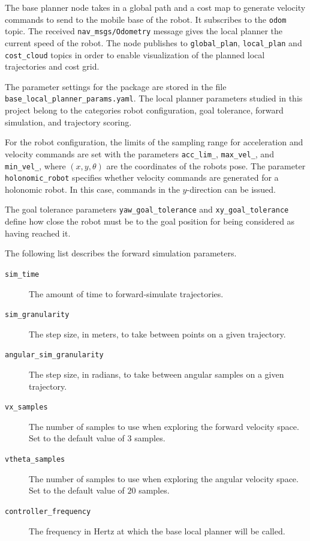 \documentclass[10pt,journal,compsoc]{IEEEtran}
\begin{document}
The base planner node takes in a global path and a cost map to generate velocity commands to send to the mobile base of the robot. It subscribes to the \texttt{odom} topic. The received \texttt{nav\_msgs/Odometry} message gives the local planner the current speed of the robot. The node publishes to \texttt{global\_plan}, \texttt{local\_plan} and \texttt{cost\_cloud} topics in order to enable visualization of the planned local trajectories and cost grid.

The parameter settings for the package are stored in the file \texttt{base\_local\_planner\_params.yaml}. The local planner parameters studied in this project belong to the categories robot configuration, goal tolerance, forward simulation, and trajectory scoring.

For the robot configuration, the limits of the sampling range for acceleration and velocity commands are set with the parameters \texttt{acc\_lim\_<x,y,theta>}, \texttt{max\_vel\_<x,theta>}, and  \texttt{min\_vel\_<x,theta>}, where $(x, y, \theta )$ are the coordinates of the robots pose. The parameter \texttt{holonomic\_robot} specifies whether velocity commands are generated for a holonomic robot. In this case, commands in the $y$-direction can be issued.

The goal tolerance parameters \texttt{yaw\_goal\_tolerance} and \texttt{xy\_goal\_tolerance} define how close the robot must be to the goal position for being considered as having reached it.

The following list describes the forward simulation parameters.
\begin{description}
\item[\texttt{sim\_time}] The amount of time to forward-simulate trajectories.
\item[\texttt{sim\_granularity}] The step size, in meters, to take between points on a given trajectory.
\item[\texttt{angular\_sim\_granularity}] The step size, in radians, to take between angular samples on a given trajectory.
\item[\texttt{vx\_samples}] The number of samples to use when exploring the forward velocity space. Set to the default value of $3$ samples.
\item[\texttt{vtheta\_samples}] The number of samples to use when exploring the angular velocity space. Set to the default value of $20$ samples.
\item[\texttt{controller\_frequency}] The frequency in Hertz at which the base local planner will be called.
\end{description}
\end{document}
